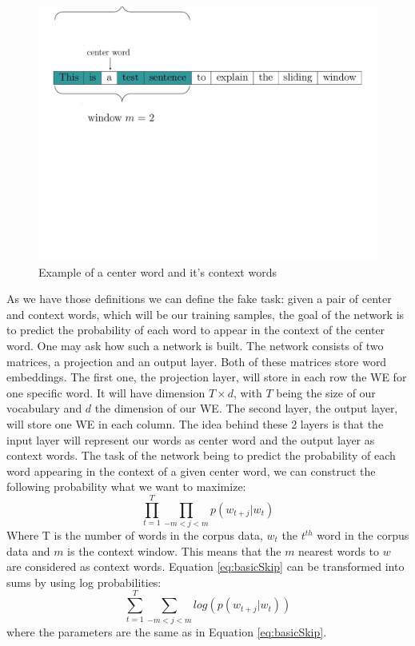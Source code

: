 \begin{figure}[h]
    \centering
            \includegraphics[scale=0.3]{images/window_ex} 
    \caption{Example of a center word and it's context words}
    \label{fig:window_ex}
\end{figure}
  As we have those definitions we can define the fake task: given a pair of center and context words, which will be our training samples, the goal of the network is to predict the probability of each word to appear in the context of the center word. One may ask how such a network is built. The network consists of two matrices, a projection and an output layer. Both of these matrices store word embeddings. The first one, the projection layer, will store in each row the WE for one specific word. It will have dimension $T\times d$, with $T$ being the size of our vocabulary and $d$ the dimension of our WE. The second layer, the output layer, will store one WE in each column. The idea behind these 2 layers is that the input layer will represent our words as center word and the output layer as context words. The task of the network being to predict the probability of each word appearing in the context of a given center word, we can construct the following probability what we want to maximize:\\
\begin{equation} \label{eq:basicSkip}
 \prod_{t=1}^T \prod_{-m<j<m}  p(w_{t+j}|w_t)
 \end{equation}
 Where T is the number of words in the corpus data, $w_t$ the $t^{th}$ word in the corpus data and $m$ is the context window. This means that the $m$ nearest words to $w$ are considered as context words.
Equation \ref{eq:basicSkip} can be transformed into sums by using log probabilities: 
\begin{equation}
 \sum _{t=1}^T \sum_{-m<j<m} log( p(w_{t+j}|w_t) )
\end{equation}
    where the parameters are the same as in Equation \ref{eq:basicSkip}.


